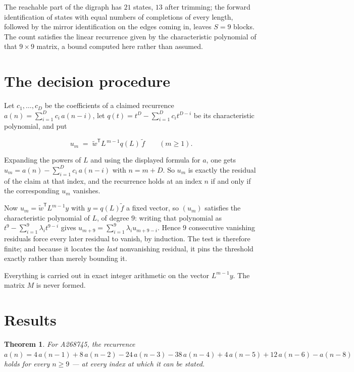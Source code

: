 \documentclass[11pt]{article}
\newtheorem{theorem}{Theorem}
\theoremstyle{definition}
\begin{document}
The reachable part of the digraph has $21$ states, $13$ after trimming; the forward identification of states with equal numbers of completions of every length, followed by the mirror identification on the edges coming in, leaves $S = 9$ blocks. The count satisfies the linear recurrence given by the characteristic polynomial of that $9\times9$ matrix, a bound computed here rather than assumed.

\section{The decision procedure}

Let $c_1,\dots,c_D$ be the coefficients of a claimed recurrence $a(n) = \sum_{i=1}^{D} c_i\,a(n-i)$, let $q(t) = t^{D} - \sum_{i=1}^{D} c_i t^{D-i}$ be its characteristic polynomial, and put

\[u_m \;=\; \tilde w^{\mathsf T} L^{\,m-1} q(L)\,\tilde f \qquad (m \ge 1).\]

Expanding the powers of $L$ and using the displayed formula for $a$, one gets $u_m = a(n) - \sum_{i=1}^{D} c_i\,a(n-i)$ with $n = m + D$. So $u_m$ is exactly the residual of the claim at that index, and the recurrence holds at an index $n$ if and only if the corresponding $u_m$ vanishes.

Now $u_m = \tilde w^{\mathsf T} L^{m-1} y$ with $y = q(L)\tilde f$ a fixed vector, so $(u_m)$ satisfies the characteristic polynomial of $L$, of degree $9$: writing that polynomial as $t^{9} - \sum_{i=1}^{9} \lambda_i t^{9-i}$ gives $u_{m+9} = \sum_{i=1}^{9} \lambda_i u_{m+9-i}$. Hence $9$ consecutive vanishing residuals force every later residual to vanish, by induction. The test is therefore finite; and because it locates the {\itshape last} nonvanishing residual, it pins the threshold exactly rather than merely bounding it.

Everything is carried out in exact integer arithmetic on the vector $L^{m-1}y$. The matrix $M$ is never formed.

\section{Results}

\begin{theorem} For A268745, the recurrence $a(n) = 4\,a(n-1) + 8\,a(n-2) - 24\,a(n-3) - 38\,a(n-4) + 4\,a(n-5) + 12\,a(n-6) - a(n-8)$ holds for every $n \ge 9$ --- at every index at which it can be stated.\end{theorem}
\end{document}
